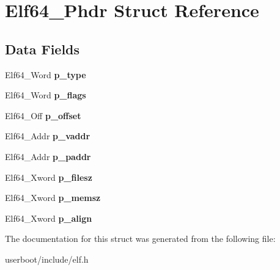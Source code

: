 \hypertarget{structElf64__Phdr}{}\section{Elf64\+\_\+\+Phdr Struct Reference}
\label{structElf64__Phdr}
\subsection*{Data Fields}
\begin{DoxyCompactItemize}
\item 
Elf64\+\_\+\+Word {\bfseries p\+\_\+type}\hypertarget{structElf64__Phdr_aee6ec430eaaf8b8faf82ae6397282cb3}{}\label{structElf64__Phdr_aee6ec430eaaf8b8faf82ae6397282cb3}

\item 
Elf64\+\_\+\+Word {\bfseries p\+\_\+flags}\hypertarget{structElf64__Phdr_ab96e7784733c2192a76d5a42897cb38b}{}\label{structElf64__Phdr_ab96e7784733c2192a76d5a42897cb38b}

\item 
Elf64\+\_\+\+Off {\bfseries p\+\_\+offset}\hypertarget{structElf64__Phdr_aa2d51fb4517ded0c74903f8d0c9abea7}{}\label{structElf64__Phdr_aa2d51fb4517ded0c74903f8d0c9abea7}

\item 
Elf64\+\_\+\+Addr {\bfseries p\+\_\+vaddr}\hypertarget{structElf64__Phdr_a5c69879e1229b175020ff011af46fcb9}{}\label{structElf64__Phdr_a5c69879e1229b175020ff011af46fcb9}

\item 
Elf64\+\_\+\+Addr {\bfseries p\+\_\+paddr}\hypertarget{structElf64__Phdr_a83f4adb032fc307f5af79bdee5ef692d}{}\label{structElf64__Phdr_a83f4adb032fc307f5af79bdee5ef692d}

\item 
Elf64\+\_\+\+Xword {\bfseries p\+\_\+filesz}\hypertarget{structElf64__Phdr_af50e5756da2acda5ccb02ebaa3367092}{}\label{structElf64__Phdr_af50e5756da2acda5ccb02ebaa3367092}

\item 
Elf64\+\_\+\+Xword {\bfseries p\+\_\+memsz}\hypertarget{structElf64__Phdr_a55fae01175fc4e3f1c23e52b14459235}{}\label{structElf64__Phdr_a55fae01175fc4e3f1c23e52b14459235}

\item 
Elf64\+\_\+\+Xword {\bfseries p\+\_\+align}\hypertarget{structElf64__Phdr_aa89a4b1835998c8866e821d777a2f879}{}\label{structElf64__Phdr_aa89a4b1835998c8866e821d777a2f879}

\end{DoxyCompactItemize}


The documentation for this struct was generated from the following file\+:\begin{DoxyCompactItemize}
\item 
userboot/include/elf.\+h\end{DoxyCompactItemize}

